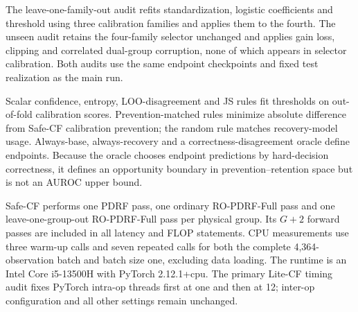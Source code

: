 \documentclass[10pt]{article}
\begin{document}
\begin{table}[ht]
\centering
\caption{Operating-point sensitivity at 40\% fault prevalence. Balanced-CF prioritizes calibration accuracy; Safe-CF prioritizes negative-transfer prevention. Values first average mechanisms within seed.}
\resizebox{0.78\textwidth}{!}{}
\end{table}

The leave-one-family-out audit refits standardization, logistic coefficients and threshold using three calibration families and applies them to the fourth. The unseen audit retains the four-family selector unchanged and applies gain loss, clipping and correlated dual-group corruption, none of which appears in selector calibration. Both audits use the same endpoint checkpoints and fixed test realization as the main run.

\begin{table}[ht]
\centering
\caption{Selector transfer to held-out and unseen mechanisms. Prevention and retention are defined relative to endpoint correctness on the strict subset.}
\resizebox{\textwidth}{!}{}
\end{table}

Scalar confidence, entropy, LOO-disagreement and JS rules fit thresholds on out-of-fold calibration scores. Prevention-matched rules minimize absolute difference from Safe-CF calibration prevention; the random rule matches recovery-model usage. Always-base, always-recovery and a correctness-disagreement oracle define endpoints. Because the oracle chooses endpoint predictions by hard-decision correctness, it defines an opportunity boundary in prevention--retention space but is not an AUROC upper bound.

\begin{table}[ht]
\centering
\caption{Matched simple-selector audit across four mechanisms and 10 fitted pairs. Macro-AUROC is mean $\pm$ standard deviation over 40 mechanism--seed cells.}
\resizebox{\textwidth}{!}{}
\end{table}

Safe-CF performs one PDRF pass, one ordinary RO-PDRF-Full pass and one leave-one-group-out RO-PDRF-Full pass per physical group. Its $G+2$ forward passes are included in all latency and FLOP statements. CPU measurements use three warm-up calls and seven repeated calls for both the complete 4,364-observation batch and batch size one, excluding data loading. The runtime is an Intel Core i5-13500H with PyTorch 2.12.1+cpu. The primary Lite-CF timing audit fixes PyTorch intra-op threads first at one and then at 12; inter-op configuration and all other settings remain unchanged.
\end{document}
